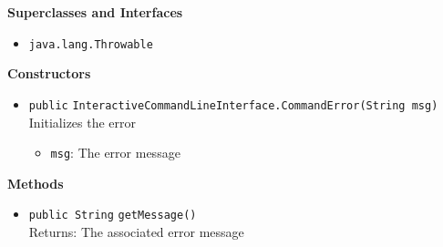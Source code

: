 \textbf{Superclasses and Interfaces}
\begin{itemize}
\item \lstinline|java.lang.Throwable|
\end{itemize}



\textbf{Constructors}
\begin{itemize}
\item \lstinline|public| \lstinline|InteractiveCommandLineInterface.CommandError|\lstinline|(String msg)|\\
Initializes the error
\begin{itemize}
\item \lstinline|msg|: The error message
\end{itemize}



\end{itemize}


\textbf{Methods}
\begin{itemize}
\item \lstinline|public String| \lstinline|getMessage|\lstinline|()|\\
Returns: The associated error message



\end{itemize}


